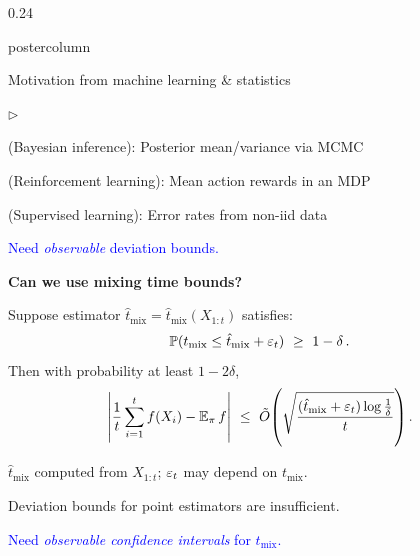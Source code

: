 \documentclass[notheorems,final]{beamer}
\newcommand{\compresslist}{%
  \setlength{\itemsep}{1pt}%
  \setlength{\parskip}{0pt}%
  \setlength{\parsep}{0pt}%
  \setlength{\leftmargin}{0.7cm}%
}
\newcommand{\BLUE}[1]{\textcolor{blue}{#1}}
\newcommand{\AWESOME}[1]{\textcolor{awesome}{#1}}
\newcommand\tmix{\ensuremath{t_{\operatorname{mix}}}}
\newcommand\tmixhat{\ensuremath{\hat{t}_{\operatorname{mix}}}}
\begin{document}
\begin{frame}{}
\begin{columns}
\begin{column}{0.24\textwidth}
\begin{beamercolorbox}[center,wd=\textwidth]{postercolumn}
\begin{minipage}[T]{.95\textwidth}
{\begin{block}{Motivation from machine learning \& statistics}
                \medskip
                \begin{list}{$\triangleright$}\compresslist
                  \item {\small(Bayesian inference)}:
                    Posterior mean/variance via MCMC

                  \item {\small(Reinforcement learning)}:
                    Mean action rewards in an MDP

                  \item {\small(Supervised learning)}:
                    Error rates from non-iid data

                \end{list}

                \medskip
                \begin{center}
                  \BLUE{%
                    Need \emph{observable} deviation bounds.
                  }
                \end{center}

                \bigskip
                \textbf{Can we use mixing time bounds?}

                \medskip
                Suppose estimator $\tmixhat = \tmixhat(X_{1:t})$ satisfies:
                \[
                  \P(\tmix \leq \tmixhat + \veps_t)
                  \ \geq \
                  1-\delta
                  \,.
                \]
                Then with probability at least $1-2\delta$,
                \[
                  \Abs{
                    \frac1t\sum_{i=1}^t f(X_i)
                    -
                    \E_\pi f
                  }
                  \ \leq \
                  \tilde O\Parens{
                    \sqrt{
                      \frac{\parens{\tmixhat + \veps_t}
                      \log\frac1\delta}{t}
                    }
                  }
                  \,.
                \]

                $\tmixhat$ computed from $X_{1:t}$;
                \AWESOME{$\varepsilon_t$ may depend on $\tmix$}.

                \begin{center}
                  \AWESOME{%
                    Deviation bounds for point estimators are insufficient.%
                  }

                  \medskip
                  \BLUE{%
                    Need \emph{observable confidence intervals} for $\tmix$.%
                  }
                \end{center}




\end{block}}
\end{minipage}
\end{beamercolorbox}
\end{column}
\end{columns}
\end{frame}
\end{document}
